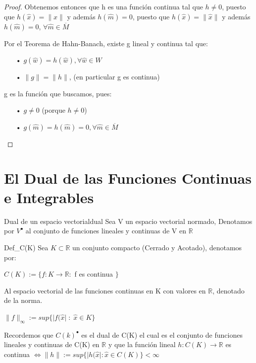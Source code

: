 \documentclass[12pt,a4paper]{book}
\providecommand{\abs}[1]{\lvert#1\rvert}
\providecommand{\norm}[1]{\lVert#1\rVert}
\providecommand{\conj}[1]{\lbrace#1\rbrace}
\begin{document}
\begin{proof}
Obtenemos entonces que h es una función continua tal que $h\neq 0$, puesto que $h(\widehat{x})=\norm{x}$ y además $h(\widehat{m})=0$, puesto que $h(\widehat{x})=\norm{\widehat{x}}$ y además $h(\widehat{m})=0$, $\forall \widehat{m}\in\overline{M}$

Por el Teorema de Hahn-Banach, existe g lineal y continua tal que:
\begin{enumerate}
\item[•] $g(\widehat{w})=h(\widehat{w}), \forall\widehat{w}\in W$ 
\item[•] $\norm{g}=\norm{h}$, (en particular g es continua)
\end{enumerate}
g es la función que buscamos, pues:
\begin{enumerate}
\item[•] $g\neq 0$ (porque $h\neq 0$)
\item[•] $g(\widehat{m})=h(\widehat{m})=0, \forall \widehat{m}\in\overline{M}$
\end{enumerate}
\end{proof}

\section{ El Dual de las Funciones Continuas e Integrables}

\begin{definicion}{Dual de un espacio vectorial}{dual}
Sea V un espacio vectorial normado, Denotamos por $V^{\bullet}$ al conjunto de funciones lineales y continuas de V en $\mathbb{R}$
\end{definicion}
\smallskip

\begin{definicion}{}{Def_C(K)}
Sea $K\subset\mathbb{R}$ un conjunto compacto (Cerrado y Acotado), denotamos por:
\begin{center}
$C(K):=\conj{f:K\rightarrow\mathbb{R}:$ f es continua $}$
\end{center}
Al espacio vectorial de las funciones continuas en K con valores en $\mathbb{R}$, denotado de la norma.
\begin{center}
$\norm{f}_{\infty}:=sup\conj{\abs{f(\widehat{x}}\;:\;\widehat{x}\in K}$
\end{center}
\end{definicion}
\smallskip

Recordemos que $C(k)^{\bullet}$ es el dual de C(K) el cual es el conjunto de funciones lineales y continuas de C(K) en $\mathbb{R}$ y que la función lineal $h:C(K)\rightarrow\mathbb{R}$ es continua $\Leftrightarrow \norm{h}:=sup\conj{\abs{h(\widehat{x}}:\widehat{x}\in C(K)}<\infty$ 
\smallskip
\end{document}
